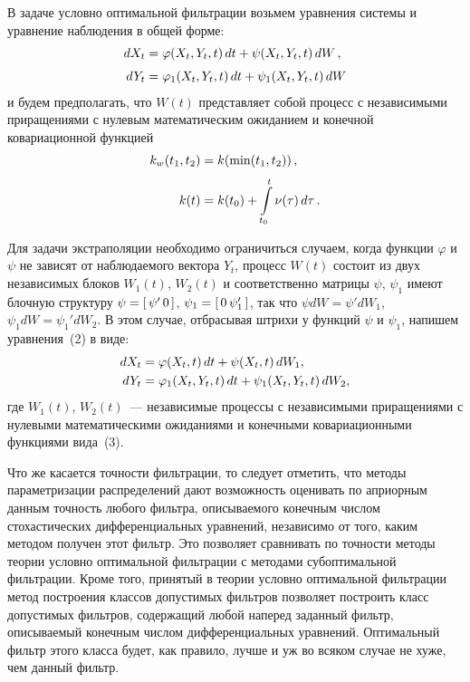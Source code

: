 \begin{multicols}{2}
В задаче условно
оптимальной фильтрации возьмем уравнения системы и уравнение
наблюдения в общей форме:
\begin{align}
    dX_t &=\varphi ( X_t,Y_t, t)\, dt +\psi( X_t,Y_t, t)\, dW\,,\notag\\[-6pt]
&\\[-6pt]
    dY_t &=\varphi_1 ( X_t,Y_t, t)\, dt +\psi_1( X_t,Y_t, t)\, dW\notag
\end{align}
и будем предполагать, что  $W(t)$ представляет собой процесс с
независимыми приращениями с нулевым математическим ожиданием  и
конечной ковариационной функцией
%
\begin{align}
k_w (t_1, t_2) &= k(\min (t_1, t_2))\,,\notag\\[-6pt]
&\\[-6pt]
k(t) &= k(t_0) +\int\limits_{t_0}^t \nu(\tau)\, d\tau\,.\notag
\end{align}

Для задачи экстраполяции необходимо ограничиться случаем, когда
функции  $\varphi$ и $\psi$ не зависят от наблюдаемого вектора
$Y_t$, процесс  $W(t)$ состоит из двух независимых блоков
$W_1(t)$, $W_2(t)$ и соответственно матрицы $\psi$, $\psi_1$ имеют
блочную структуру $\psi =\left[\, \psi'\,0\,\right]$, $\psi_1 =\left[\,
0\,\psi_1'\,\right]$, так что  $\psi dW =\psi' dW_1$, $\psi_1 dW
=\psi_1' dW_2$. В этом случае, отбрасывая штрихи у функций  $\psi$
и  $\psi_1$, напишем уравнения~(2) в виде:
\begin{align*}
dX_t&=\varphi (X_t,t)\,dt +\psi (X_t,t)\,dW_1,\\
dY_t&=\varphi_1 ( X_t,Y_t, t)\,dt +\psi_1 ( X_t,Y_t, t)\,dW_2,
\end{align*}
где  $W_1(t)$, $W_2(t)$~--- независимые процессы с независимыми
приращениями с нулевыми математическими ожиданиями и конечными
ковариационными функциями вида~(3).

Что же касается точности фильтрации, то следует отметить, что методы 
параметризации распределений дают возможность оценивать по априорным данным 
точность любого фильтра, описываемого конечным числом стохастических 
дифференциальных уравнений, независимо от того, каким методом получен этот 
фильтр. Это позволяет сравнивать по точности методы теории условно оптимальной 
фильтрации с методами субоптимальной фильтрации. Кроме того, принятый в теории 
условно оптимальной фильтрации метод построения классов допустимых фильтров 
позволяет построить класс допустимых фильтров, содержащий любой наперед 
заданный фильтр, описываемый конечным чис\-лом дифференциальных уравнений. 
Оптимальный фильтр этого класса будет, как правило, лучше и уж во всяком случае 
не хуже, чем данный фильтр.


\end{multicols}

